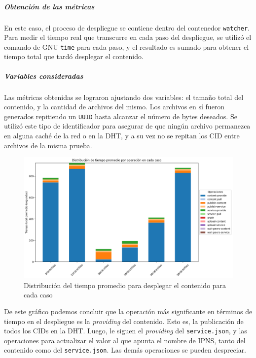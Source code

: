 \subparagraph{Obtención de las métricas} En este caso, el proceso de despliegue se contiene dentro del contenedor \texttt{watcher}. Para medir el tiempo real que transcurre en cada paso del despliegue, se utilizó el comando de GNU \texttt{time} para cada paso, y el resultado es sumado para obtener el tiempo total que tardó desplegar el contenido.

\subparagraph{Variables consideradas} Las métricas obtenidas se lograron ajustando dos variables: el tamaño total del contenido, y la cantidad de archivos del mismo. Los archivos en sí fueron generados repitiendo un \texttt{UUID} hasta alcanzar el número de bytes deseados. Se utilizó este tipo de identificador para asegurar de que ningún archivo permanezca en alguna caché de la red o en la DHT, y a su vez no se repitan los CID entre archivos de la misma prueba.

\begin{figure}[H]
    \centering
    \includegraphics[width=1\linewidth]{img/metricas-ipfs/metricas-ipfs-caso1-1.png}
    \caption{Distribución del tiempo promedio para desplegar el contenido para cada caso}
    \label{fig:metricas-ipfs-caso1-1.png}
\end{figure}

De este gráfico podemos concluir que la operación más significante en términos de tiempo en el despliegue es la \textit{providing} del contenido. Esto es, la publicación de todos los CIDs en la DHT. Luego, le siguen el \textit{providing} del \texttt{service.json}, y las operaciones para actualizar el valor al que apunta el nombre de IPNS, tanto del contenido como del \texttt{service.json}. Las demás operaciones se pueden despreciar.



